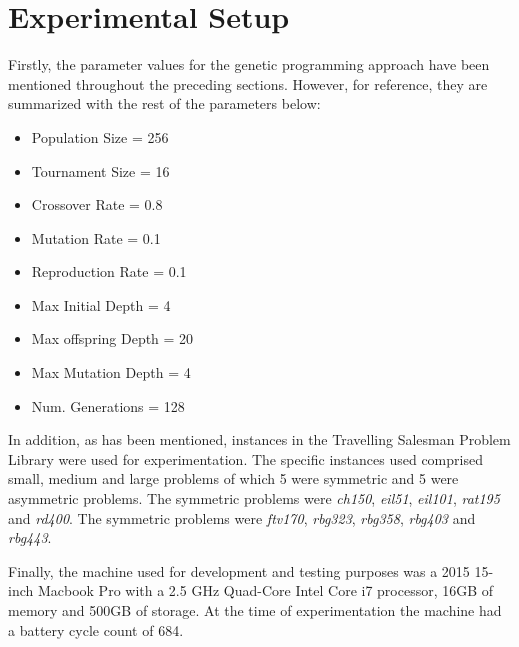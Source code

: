 \section{Experimental Setup}
Firstly, the parameter values for the genetic programming approach have been mentioned throughout the preceding sections. However, for reference, they are summarized with the rest of the parameters below:

\begin{multicols}{2}
\begin{itemize}
    \item Population Size = 256
    \item Tournament Size = 16
    \item Crossover Rate = 0.8
    \item Mutation Rate = 0.1
    \item Reproduction Rate = 0.1
    \item Max Initial Depth = 4
    \item Max offspring Depth = 20
    \item Max Mutation Depth = 4
    \item Num. Generations = 128
\end{itemize}
\end{multicols}

In addition, as has been mentioned, instances in the Travelling Salesman Problem Library \cite{reinelt1991tsplib} were used for experimentation. The specific instances used comprised small, medium and large problems of which 5 were symmetric and 5 were asymmetric problems. The symmetric problems were \emph{ch150}, \emph{eil51}, \emph{eil101}, \emph{rat195} and \emph{rd400}. The symmetric problems were \emph{ftv170}, \emph{rbg323}, \emph{rbg358}, \emph{rbg403} and \emph{rbg443}.

Finally, the machine used for development and testing purposes was a 2015 15-inch Macbook Pro with a 2.5 GHz Quad-Core Intel Core i7 processor, 16GB of memory and 500GB of storage. At the time of experimentation the machine had a battery cycle count of 684.